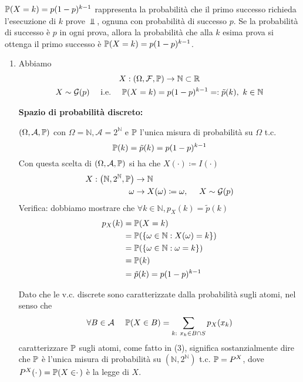 \begin{oss}
$\mathbb{P}( X=k) =p( 1-p)^{k-1}$ rappresenta la probabilità che il primo successo richieda l'esecuzione di $k$ prove $\Bot $, ognuna con probabilità di successo $p$. Se la probabilità di successo è $p$ in ogni prova, allora la probabilità che alla $k$ esima prova si ottenga il primo successo è $\mathbb{P}( X=k) =p( 1-p)^{k-1}$.
\end{oss}
\begin{enumerate}
\item Abbiamo
\begin{gather*}
X:( \Omega ,\mathcal{F} ,\mathbb{P})\rightarrow \mathbb{N} \subset \mathbb{R}\\
X\sim \mathcal{G}( p) \ \ \ \ \text{i.e.} \ \ \ \ \mathbb{P}( X=k) =p( 1-p)^{k-1} =:\tilde{p}( k) ,\ k\in \mathbb{N}
\end{gather*}

\textbf{Spazio di probabilità discreto:}

$( \Omega ,\mathcal{A} ,\mathbb{P})$ con $\Omega =\mathbb{N} ,\mathcal{A} =2^{\mathbb{N}}$ e $\mathbb{P}$ l'unica misura di probabilità su $\Omega $ t.c.
\begin{equation}
\mathbb{P}( k) =\tilde{p}( k) =p( 1-p)^{k-1}
\end{equation}
Con questa scelta di $( \Omega ,\mathcal{A} ,\mathbb{P})$ si ha che $X( \cdotp ) \coloneqq I( \cdotp )$
\begin{align*}
X:\left(\mathbb{N} ,2^{\mathbb{N}} ,\mathbb{P}\right) & \rightarrow \mathbb{N}\\
\omega  & \rightarrow X( \omega ) \coloneqq \omega ,\ \ \ \ X\sim \mathcal{G}( p)
\end{align*}
Verifica: dobbiamo mostrare che $\forall k\in \mathbb{N} ,p_{X}( k) =\tilde{p}( k)$
\begin{align*}
p_{X}( k) & =\mathbb{P}( X=k)\\
 & =\mathbb{P}(\{\omega \in \mathbb{N} :X( \omega ) =k\})\\
 & =\mathbb{P}(\{\omega \in \mathbb{N} :\omega =k\})\\
 & =\mathbb{P}( k)\\
 & =\tilde{p}( k) =p( 1-p)^{k-1}
\end{align*}

\begin{oss}
Dato che le v.c. discrete sono caratterizzate dalla probabilità sugli atomi, nel senso che
\begin{equation*}
\forall B\in \mathcal{A} \ \ \ \ \mathbb{P}( X\in B) =\sum\limits _{k:\ x_{k} \in B\cap S} p_{X}( x_{k})
\end{equation*}
caratterizzare $\mathbb{P}$ sugli atomi, come fatto in (3), significa sostanzialmente dire che $\mathbb{P}$ è l'unica misura di probabilità su $\left(\mathbb{N} ,2^{\mathbb{N}}\right)$ t.c. $\mathbb{P} =P^{X}$, dove $P^{X}( \cdotp ) =\mathbb{P}( X\in \cdotp )$ è la legge di $X$.


\end{oss}
\end{enumerate}
